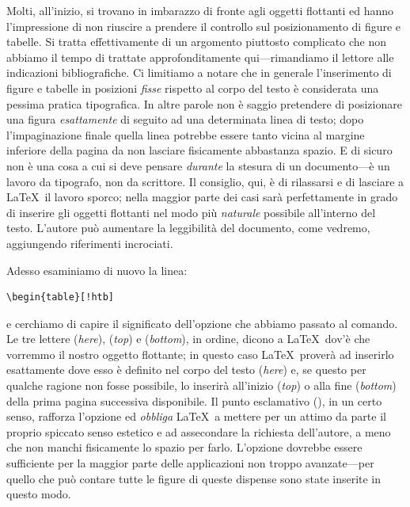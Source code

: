 Molti, all'inizio, si trovano in imbarazzo di fronte agli oggetti flottanti
ed hanno l'impressione di non riuscire a prendere il controllo sul
posizionamento di figure e tabelle. Si tratta effettivamente di un argomento
piuttosto complicato che non abbiamo il tempo di trattate approfonditamente
qui---rimandiamo il lettore alle indicazioni bibliografiche.
Ci limitiamo a notare che in generale l'inserimento di figure e tabelle in
posizioni \emph{fisse} rispetto al corpo del testo \`e considerata una pessima
pratica tipografica. In altre parole non \`e saggio pretendere di
posizionare una figura \emph{esattamente} di seguito ad una determinata linea
di testo; dopo l'impaginazione finale quella linea potrebbe essere tanto
vicina al margine inferiore della pagina da non lasciare fisicamente
abbastanza spazio. E di sicuro non \`e una cosa a cui si deve pensare
\emph{durante} la stesura di un documento---\`e un lavoro da tipografo, non
da scrittore.
Il consiglio, qui, \`e di rilassarsi e di lasciare a \LaTeX\ il lavoro
sporco; nella maggior parte dei casi sar\`a perfettamente in grado di
inserire gli oggetti flottanti nel modo pi\`u \emph{naturale} possibile
all'interno del testo. L'autore pu\`o aumentare la leggibilit\`a del
documento, come vedremo, aggiungendo riferimenti incrociati.

Adesso esaminiamo di nuovo la linea:
\begin{verbatim}
\begin{table}[!htb]
\end{verbatim}
e cerchiamo di capire il significato dell'opzione  che abbiamo
passato al comando. Le tre lettere  (\emph{here}),
 (\emph{top}) e  (\emph{bottom}),
in ordine, dicono a \LaTeX\ dov'\`e che vorremmo il nostro oggetto
flottante; in questo caso \LaTeX\ prover\`a ad inserirlo esattamente
dove esso \`e definito nel corpo del testo (\emph{here}) e, se questo
per qualche ragione non fosse possibile, lo inserir\`a all'inizio (\emph{top})
o alla fine (\emph{bottom}) della prima pagina successiva disponibile.
Il punto esclamativo (\cchar{!}), in un certo senso, rafforza l'opzione ed
\emph{obbliga} \LaTeX\ a mettere per un attimo da parte il proprio spiccato
senso estetico e ad assecondare la richiesta dell'autore, a meno che non
manchi fisicamente lo spazio per farlo.
L'opzione  dovrebbe essere sufficiente per la maggior parte
delle applicazioni non troppo avanzate---per quello che pu\`o contare tutte
le figure di queste dispense sono state inserite in questo modo.


